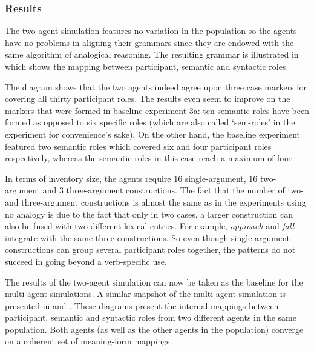 \subsubsection{Results}
 The two-agent simulation features no variation in the population so the agents have no problems in aligning their grammars since they are endowed with the same algorithm of analogical reasoning. The resulting grammar is illustrated in  which shows the mapping between participant, semantic and syntactic roles.

The diagram shows that the two agents indeed agree upon three case markers for covering all thirty participant roles. The results even seem to improve on the markers that were formed in baseline experiment 3a: ten semantic roles have been formed as opposed to six specific roles (which are also called `sem-roles' in the experiment for convenience's sake). On the other hand, the baseline experiment featured two semantic roles which covered six and four participant roles respectively, whereas the semantic roles in this case reach a maximum of four.

In terms of inventory size, the agents require 16 single-argument, 16 two-argument and 3 three-argument constructions. The fact that the number of two- and three-argument constructions is almost the same as in the experiments using no analogy is due to the fact that only in two cases, a larger construction can also be fused with two different lexical entries. For example, {\em approach} and {\em fall} integrate with the same three constructions. So even though single-argument constructions can group several participant roles together, the patterns do not succeed in going beyond a verb-specific use.

The results of the two-agent simulation can now be taken as the baseline for the multi-agent simulations. A similar snapshot of the multi-agent simulation is presented in  and . These diagrams present the internal mappings between participant, semantic and syntactic roles from two different agents in the same population. Both agents (as well as the other agents in the population) converge on a coherent set of meaning-form mappings.

